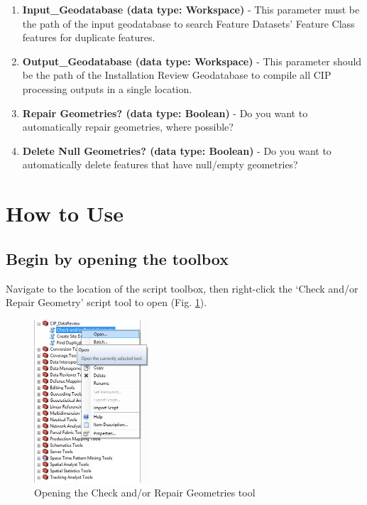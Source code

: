 \documentclass[openany]{book}
\providecommand{\tightlist}{%
  \setlength{\itemsep}{0pt}\setlength{\parskip}{0pt}}
\theoremstyle{definition}
\theoremstyle{definition}
\theoremstyle{definition}
\theoremstyle{remark}
\begin{document}
\begin{enumerate}
\def\labelenumi{\arabic{enumi}.}
\tightlist
\item
  \textbf{Input\_Geodatabase (data type: Workspace)} - This parameter
  must be the path of the input geodatabase to search Feature Datasets'
  Feature Class features for duplicate features.
\item
  \textbf{Output\_Geodatabase (data type: Workspace)} - This parameter
  should be the path of the Installation Review Geodatabase to compile
  all CIP processing outputs in a single location.
\item
  \textbf{Repair Geometries? (data type: Boolean)} - Do you want to
  automatically repair geometries, where possible?
\item
  \textbf{Delete Null Geometries? (data type: Boolean)} - Do you want to
  automatically delete features that have null/empty geometries?
\end{enumerate}

\section{How to Use}\label{how-to-use-5}

\subsection{Begin by opening the
toolbox}\label{begin-by-opening-the-toolbox-5}

Navigate to the location of the script toolbox, then right-click the
`Check and/or Repair Geometry' script tool to open (Fig.
\ref{fig:chkGopen}).

\begin{figure}[H]

{\centering \includegraphics[width=1.68in,]{figures/chkG-open} 

}

\caption{Opening the Check and/or Repair Geometries tool}\label{fig:chkGopen}
\end{figure}
\end{document}
